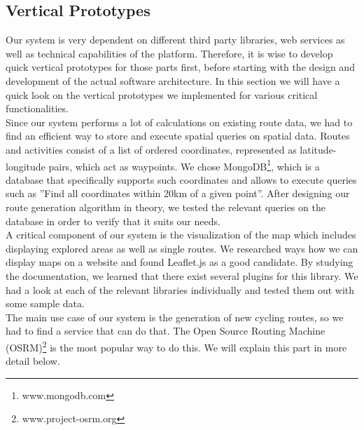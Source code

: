\documentclass{sigchi}
\begin{document}
\subsection{Vertical Prototypes}
Our system is very dependent on different third party libraries, web services as well as technical capabilities of the platform. Therefore, it is wise to develop quick vertical prototypes for those parts first, before starting with the design and development of the actual software architecture. In this section we will have a quick look on the vertical prototypes we implemented for various critical functionalities.\\
Since our system performs a lot of calculations on existing route data, we had to find an efficient way to store and execute spatial queries on spatial data. Routes and activities consist of a list of ordered coordinates, represented as latitude-longitude pairs, which act as waypoints. We chose MongoDB\footnote{www.mongodb.com}, which is a database that specifically supports such coordinates and allows to execute queries such as ''Find all coordinates within 20km of a given point''. After designing our route generation algorithm in theory, we tested the relevant queries on the database in order to verify that it suits our needs. \\
A critical component of our system is the visualization of the map which includes displaying explored areas as well as single routes. We researched ways how we can display maps on a website and found Leaflet.js as a good candidate. By studying the documentation, we learned that there exist several plugins for this library. We had a look at each of the relevant libraries individually and tested them out with some sample data.\\
The main use case of our system is the generation of new cycling routes, so we had to find a service that can do that. The Open Source Routing Machine (OSRM)\footnote{www.project-osrm.org} is the most popular way to do this. We will explain this part in more detail below.
\end{document}
